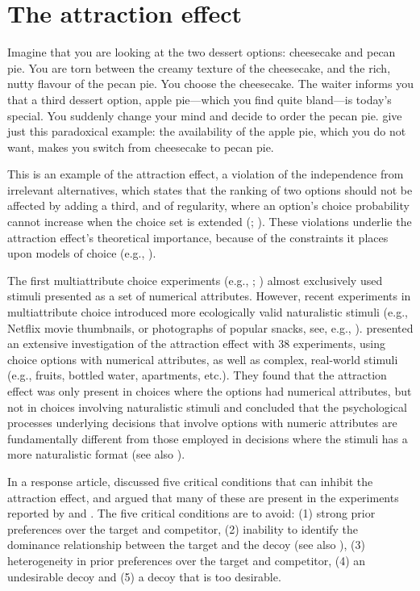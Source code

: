 \documentclass[12pt, a4paper]{article}
\begin{document}
\newpage
\RaggedRight

\section*{The attraction effect}


Imagine that you are looking at the two dessert options: cheesecake and pecan pie. You are torn between the creamy texture of the cheesecake, and the rich, nutty flavour of the pecan pie. You choose the cheesecake. The waiter informs you that a third dessert option, apple pie---which you find quite bland---is today's special. You suddenly change your mind and decide to order the pecan pie.  give just this paradoxical example: the availability of the apple pie, which you do not want, makes you switch from cheesecake to pecan pie.

This is an example of the attraction effect, a violation of the independence from irrelevant alternatives, which states that the ranking of two options should not be affected by adding a third, and of regularity, where an option's choice probability cannot increase when the choice set is extended (; ). These violations underlie the attraction effect's theoretical importance, because of the constraints it places upon models of choice (e.g., ).

The first multiattribute choice experiments (e.g., ; ) almost exclusively used stimuli presented as a set of numerical attributes. However, recent experiments in multiattribute choice introduced more ecologically valid naturalistic stimuli (e.g., Netflix movie thumbnails, or photographs of popular snacks, see, e.g., ).  presented an
extensive investigation of the attraction effect with 38 experiments, using choice options with numerical attributes, as well as complex, real-world stimuli (e.g., fruits, bottled water, apartments, etc.). They found that the attraction effect was only present in choices where the options had numerical attributes, but not in choices involving naturalistic stimuli and concluded that the psychological processes underlying decisions that involve options with numeric attributes are fundamentally different from those employed in decisions where the stimuli has a more naturalistic format (see also ). 

In a response article,  discussed five critical conditions that can inhibit the attraction effect, and argued that many of these are present in the experiments reported by  and . The five critical conditions are to avoid: (1) strong prior preferences over the target and competitor, (2) inability to identify the dominance relationship between the target and the decoy (see also ), (3) heterogeneity in prior preferences over the target and competitor, (4) an undesirable decoy and (5) a decoy that is too desirable. 
\end{document}
